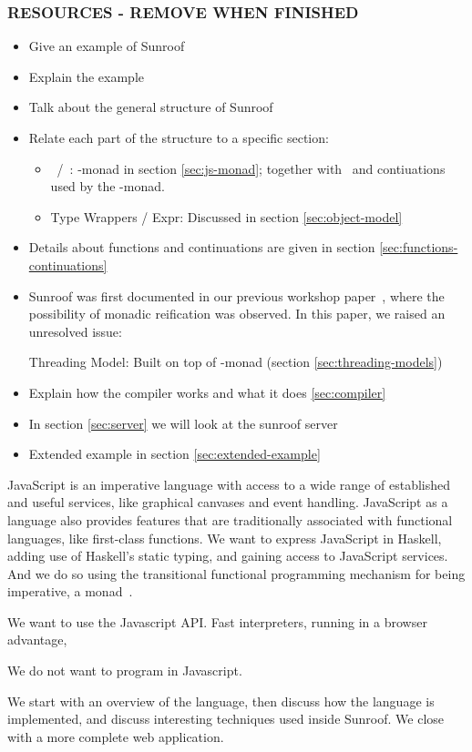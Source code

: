 \subsubsection{RESOURCES - REMOVE WHEN FINISHED}

\begin{itemize}
\item Give an example of Sunroof 
\item Explain the example
\item Talk about the general structure of Sunroof
\item Relate each part of the structure to a specific section:
  \begin{itemize}
  \item \JSA\ /\ \JSB: \JS-monad in section \ref{sec:js-monad};
  together with \JSI\ and contiuations used by the \JS-monad.
  \item Type Wrappers / Expr: Discussed in section \ref{sec:object-model}
  \end{itemize}
\item Details about functions and continuations are given in section \ref{sec:functions-continuations}
\item 
Sunroof was first documented in our previous 
workshop paper~\cite{Farmer:12:WebDSLs},
where the possibility of monadic reification was observed.
In this paper, we raised an unresolved issue:

Threading Model: Built on top of \JS-monad (section \ref{sec:threading-models})
\item Explain how the compiler works and what it does \ref{sec:compiler}
\item In section \ref{sec:server} we will look at the sunroof server 
\item Extended example in section \ref{sec:extended-example}
\end{itemize}

JavaScript is an imperative language with access to a wide range
of established and useful services, like graphical canvases and event
handling. JavaScript as a language also provides features that are
traditionally associated with functional languages, like first-class 
functions. We want to express JavaScript in Haskell, adding use
of Haskell's static typing, and gaining access to JavaScript services.
And we do so using the transitional functional programming 
mechanism for being imperative, a monad~\cite{Moggi:91:ComputationMonads}.


We want to use the Javascript API. Fast interpreters,
running in a browser advantage, 

We do not want to program in Javascript.

We start with an overview of the language, then discuss
how the language is implemented, and discuss interesting
techniques used inside Sunroof. We close with a more
complete web application.




